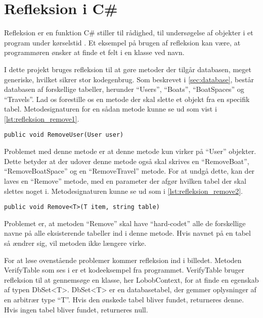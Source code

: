 \section{Refleksion i C\#}
\label{sec:refleksion}


Refleksion er en funktion C\# stiller til rådighed, til undersøgelse af objekter i et program under kørselstid \cite{michaelis2012essential}. Et eksempel på brugen af refleksion kan være, at programmøren ønsker at finde et felt i en klasse ved navn.

I dette projekt bruges refleksion til at gøre metoder der tilgår databasen, meget generiske, hvilket sikrer stor kodegenbrug. Som beskrevet i \cref{sec:database}, består databasen af forskellige tabeller, herunder \enquote{Users}, \enquote{Boats}, \enquote{BoatSpaces} og \enquote{Travels}. Lad os forestille os en metode der skal slette et objekt fra en specifik tabel. Metodesignaturen for en sådan metode kunne se ud som vist i \cref{lst:refleksion_remove1}.


\begin{lstlisting}[label=lst:refleksion_remove1]
public void RemoveUser(User user)
\end{lstlisting}

Problemet med denne metode er at denne metode kun virker på \enquote{User} objekter. Dette betyder at der udover denne metode også skal skrives en \enquote{RemoveBoat}, \enquote{RemoveBoatSpace} og en \enquote{RemoveTravel} metode. For at undgå dette, kan der laves en \enquote{Remove} metode, med en parameter der afgør hvilken tabel der skal slettes noget i. Metodesignaturen kunne se ud som i \cref{lst:refleksion_remove2}.


\begin{lstlisting}[label=lst:refleksion_remove2]
public void Remove<T>(T item, string table)
\end{lstlisting}

Problemet er, at metoden \enquote{Remove} skal have \enquote{hard-codet} alle de forskellige navne på alle eksisterende tabeller ind i denne metode. Hvis navnet på en tabel så ændrer sig, vil metoden ikke længere virke.

For at løse ovenstående problemer kommer refleksion ind i billedet. Metoden VerifyTable som ses i  er et kodeeksempel fra programmet. VerifyTable bruger refleksion til at gennemsøge en klasse, her LobobContext, for at finde en egenskab af typen DbSet<T>. DbSet<T> er en databasetabel, der gemmer oplysninger af en arbitrær type \enquote{T}. Hvis den ønskede tabel bliver fundet, returneres denne. Hvis ingen tabel bliver fundet, returneres null.

